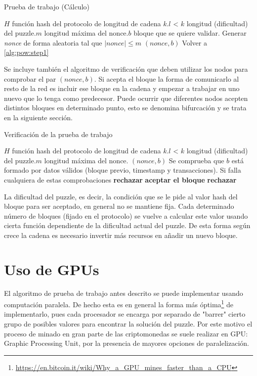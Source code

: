 \begin{algorithm}
\caption{Prueba de trabajo (Cálculo)}\label{alg:pow}
\begin{algorithmic}[1]
\Require \Statex $H$ función hash del protocolo de longitud de cadena $k$.\Statex $l$ < $k$ longitud (dificultad) del puzzle.\Statex $m$ longitud máxima del nonce.\Statex $b$ bloque que se quiere validar.
\State Generar \textit{nonce} de forma aleatoria tal que $|nonce| \leq m$ \label{alg:pow:step1}
 \Return $(nonce, b)$
\Else  Volver a  \ref{alg:pow:step1}
\EndIf
\end{algorithmic}
\end{algorithm}

Se incluye también el algoritmo de verificación que deben utilizar los nodos para comprobar el par $(nonce, b)$. Si acepta el bloque la forma de comunicarlo al resto de la red es incluir ese bloque en la cadena y empezar a trabajar en uno nuevo que lo tenga como predecesor. Puede ocurrir que diferentes nodos acepten distintos bloques en determinado punto, esto se denomina bifurcación y se trata en la siguiente sección.
\begin{algorithm}
\caption{Verificación de la prueba de trabajo}\label{alg:pow_check}
\begin{algorithmic}[1]
\Require \Statex $H$ función hash del protocolo de longitud de cadena $k$.\Statex $l$ < $k$ longitud (dificultad) del puzzle.\Statex $m$ longitud máxima del nonce. \Statex $(nonce, b)$
\State Se comprueba que $b$ está formado por datos válidos (bloque previo, timestamp y transacciones). Si falla cualquiera de estas comprobaciones \textbf{rechazar}
 \Return \textbf{aceptar el bloque}
\Else  \textbf{ rechazar}
\EndIf
\end{algorithmic}
\end{algorithm}

La dificultad del puzzle, es decir, la condición que se le pide al valor hash del bloque para ser aceptado, en general no se mantiene fija. Cada determinado número de bloques (fijado en el protocolo) se vuelve a calcular este valor usando cierta función dependiente de la dificultad actual del puzzle. De esta forma según crece la cadena es necesario invertir más recursos en añadir un nuevo bloque.
\section{Uso de GPUs}
El algoritmo de prueba de trabajo antes descrito se puede implementar usando computación paralela. De hecho esta es en general la forma más óptima\footnote{\url{https://en.bitcoin.it/wiki/Why_a_GPU_mines_faster_than_a_CPU}} de implementarlo, pues cada procesador se encarga por separado de "barrer" cierto grupo de posibles valores para encontrar la solución del puzzle. Por este motivo el proceso de minado en gran parte de las criptomonedas se suele realizar en GPU: Graphic Processing Unit, por la presencia de mayores opciones de paralelización.


